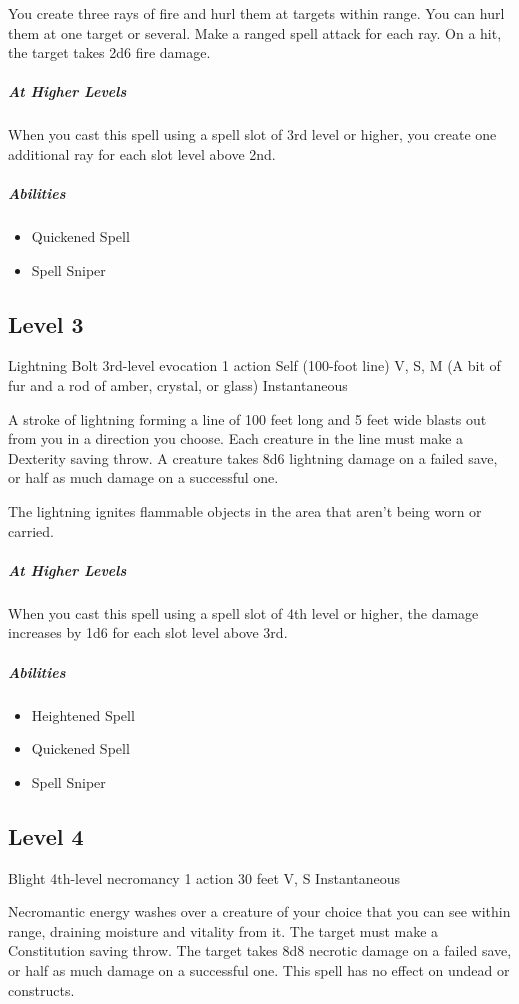 \documentclass[a4paper,openany,twocolumn]{book}
\begin{document}
You create three rays of fire and hurl them at targets within range. You can hurl them at one target or several. Make a ranged spell attack for each ray. On a hit, the target takes 2d6 fire damage.
    
\subparagraph*{At Higher Levels} When you cast this spell using a spell slot of 3rd level or higher, you create one additional ray for each slot level above 2nd.

\subparagraph*{Abilities}
\begin{itemize}
  \item Quickened Spell
  \item Spell Sniper
\end{itemize}

\subsection*{Level 3}

\DndSpellHeader
  {Lightning Bolt}
  {3rd-level evocation}
  {1 action}
  {Self (100-foot line)}
  {V, S, M (A bit of fur and a rod of amber, crystal, or glass)}
  {Instantaneous}

A stroke of lightning forming a line of 100 feet long and 5 feet wide blasts out from you in a direction you choose. Each creature in the line must make a Dexterity saving throw. A creature takes 8d6 lightning damage on a failed save, or half as much damage on a successful one.
    
The lightning ignites flammable objects in the area that aren't being worn or carried.
    
\subparagraph*{At Higher Levels} When you cast this spell using a spell slot of 4th level or higher, the damage increases by 1d6 for each slot level above 3rd.

\subparagraph*{Abilities}
\begin{itemize}
  \item Heightened Spell
  \item Quickened Spell
  \item Spell Sniper
\end{itemize}

\subsection*{Level 4}

\DndSpellHeader
  {Blight}
  {4th-level necromancy}
  {1 action}
  {30 feet}
  {V, S}
  {Instantaneous}

Necromantic energy washes over a creature of your choice that you can see within range, draining moisture and vitality from it. The target must make a Constitution saving throw. The target takes 8d8 necrotic damage on a failed save, or half as much damage on a successful one. This spell has no effect on undead or constructs. 
    
\end{document}
